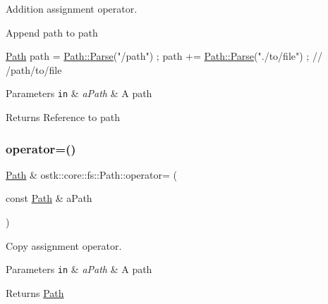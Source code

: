 Addition assignment operator. 

Append path to path


\begin{DoxyCode}
\hyperlink{classostk_1_1core_1_1fs_1_1_path_a1a5fff28594542489223b4cfad6cc9fb}{Path} path = \hyperlink{classostk_1_1core_1_1fs_1_1_path_ad08539ba654f5df11c4bcb07276345ad}{Path::Parse}(\textcolor{stringliteral}{"/path"}) ;
path += \hyperlink{classostk_1_1core_1_1fs_1_1_path_ad08539ba654f5df11c4bcb07276345ad}{Path::Parse}(\textcolor{stringliteral}{"./to/file"}) ; \textcolor{comment}{// /path/to/file}
\end{DoxyCode}



\begin{DoxyParams}[1]{Parameters}
\mbox{\tt in}  & {\em a\+Path} & A path \\
\hline
\end{DoxyParams}
\begin{DoxyReturn}{Returns}
Reference to path 
\end{DoxyReturn}
\mbox{\label{classostk_1_1core_1_1fs_1_1_path_a6699145e4985cba5e183b0a4fb0527fd}} 
\subsubsection{\texorpdfstring{operator=()}{operator=()}}
{\footnotesize\ttfamily \hyperlink{classostk_1_1core_1_1fs_1_1_path}{Path} \& ostk\+::core\+::fs\+::\+Path\+::operator= (\begin{DoxyParamCaption}\item[{const \hyperlink{classostk_1_1core_1_1fs_1_1_path}{Path} \&}]{a\+Path }\end{DoxyParamCaption})}



Copy assignment operator. 


\begin{DoxyParams}[1]{Parameters}
\mbox{\tt in}  & {\em a\+Path} & A path \\
\hline
\end{DoxyParams}
\begin{DoxyReturn}{Returns}
\hyperlink{classostk_1_1core_1_1fs_1_1_path}{Path} 
\end{DoxyReturn}
\mbox{\label{classostk_1_1core_1_1fs_1_1_path_ae45d6cca5419b3cb362e2924ed535d4f}} 
